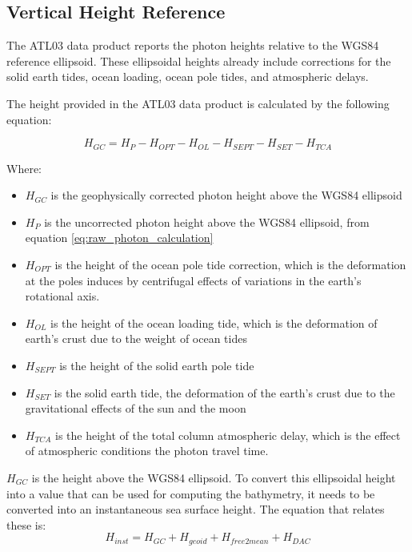 \subsection{Vertical Height Reference}

The ATL03 data product reports the photon heights relative to the WGS84 reference ellipsoid. These ellipsoidal heights already include corrections for the solid earth tides, ocean loading, ocean pole tides, and atmospheric delays.

The height provided in the ATL03 data product is calculated by the following equation:

\[H_{GC} =  H_{P} - H_{OPT} - H_{OL} - H_{SEPT} - H_{SET} - H_{TCA}\]

Where:

\begin{itemize}
      \item \(H_{GC}\) is the geophysically corrected photon height above the WGS84 ellipsoid
      \item \(H_{P}\) is the uncorrected photon height above the WGS84 ellipsoid, from equation \ref{eq:raw_photon_calculation}
      \item \(H_{OPT}\) is the height of the ocean pole tide correction, which is the deformation at the poles induces by centrifugal effects of variations in the earth's rotational axis.
      \item \(H_{OL}\) is the height of the ocean loading tide, which is the deformation of earth's crust due to the weight of ocean tides
      \item \(H_{SEPT}\) is the height of the solid earth pole tide
      \item \(H_{SET}\) is the solid earth tide, the deformation of the earth's crust due to the gravitational effects of the sun and the moon
      \item \(H_{TCA}\) is the height of the total column atmospheric delay, which is the effect of atmospheric conditions the photon travel time.
\end{itemize}

$H_{GC}$ is the height above the WGS84 ellipsoid. To convert this ellipsoidal height into a value that can be used for computing the bathymetry, it needs to be converted into an instantaneous sea surface height. The equation that relates these is:
\begin{equation}
      H_{inst} = H_{GC} + H_{geoid} + H_{free2mean} + H_{DAC}
\end{equation}

